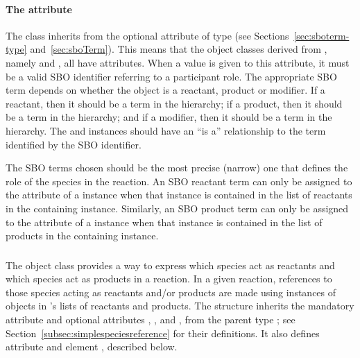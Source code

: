\paragraph{The  attribute}
\label{sec:simplespeciesreference-sboterm}

The class \SimpleSpeciesReference inherits from \SBase
the optional  attribute of type
 (see Sections~\ref{sec:sboterm-type}
and~\ref{sec:sboTerm}).  This means that the object classes
derived from \SimpleSpeciesReference, namely \SpeciesReference and
\ModifierSpeciesReference, all have 
attributes.  When a value is given to this
attribute, it must be a valid SBO identifier
referring to a participant role.  The appropriate SBO
term depends on whether the object is a reactant, product or
modifier.  If a reactant, then it should be a term in the
\sboreactant hierarchy; if a product, then it should be a term in
the \sboproduct hierarchy; and if a modifier, then it should be a
term in the \sbomodifier hierarchy.  The \SpeciesReference and
\ModifierSpeciesReference instances should have an ``is a''
relationship to the term identified by the SBO identifier.

The SBO terms chosen should be the most precise (narrow) one that
defines the role of the species in the reaction.  An SBO reactant
term can only be assigned to the
 attribute of a \SpeciesReference instance when
that instance is contained in the list of reactants in the
containing \Reaction instance.  Similarly, an SBO product term can
only be assigned to the  attribute of a
\SpeciesReference instance when that instance is contained in the
list of products in the containing \Reaction instance.


\subsubsection{}
\label{subsec:speciesreference}

The \Reaction object class provides a way to express which species
act as reactants and which species act as products in a reaction.
In a given reaction, references to those species acting as
reactants and/or products are made using instances of
\SpeciesReference objects in \Reaction's lists of reactants and
products.  The \SpeciesReference structure inherits the mandatory
attribute  and optional attributes ,
, and , from the parent type
\SimpleSpeciesReference; see
Section~\ref{subsec:simplespeciesreference} for their definitions.
It also defines attribute  and
element , described below.

